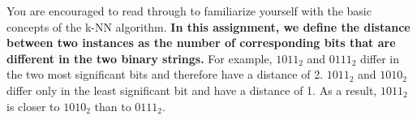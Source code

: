 \documentclass[paper=letter, fontsize=10pt]{scrartcl} %
\numberwithin{equation}{section} %
\numberwithin{figure}{section} %
\numberwithin{table}{section} %
\begin{document}
You are encouraged to read through \cite{knn} to familiarize yourself with the basic concepts of the k-NN algorithm. \textbf{In this assignment, we define the distance between two instances as the number of corresponding bits that are different in the two binary strings.} For example, $1011_2$ and $0111_2$ differ in the two most significant bits and therefore have a distance of 2. $1011_2$ and $1010_2$ differ only in the least significant bit and have a distance of 1. As a result, $1011_2$ is closer to $1010_2$ than to $0111_2$. %

\end{document}
